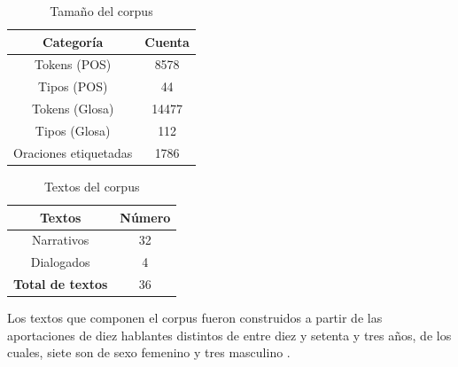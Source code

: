 \documentclass[letterpaper,12pt,oneside]{book}
\theoremstyle{definition}
\begin{document}
	\begin{table}

		\centering

		\begin{tabular}{c | c}

			\textbf{Categoría} & \textbf{Cuenta} \\ \hline

			Tokens (POS) & 8578\\

			Tipos (POS) & 44\\

			Tokens (Glosa) & 14477\\

			Tipos (Glosa) & 112\\

			Oraciones etiquetadas & 1786 \\ 

		\end{tabular}

		\caption{Tamaño del corpus}

		\label{table_corpus_length:1}

	\end{table}

	
	\begin{table}

		\centering

		\begin{tabular}{ c | c }

			\textbf{Textos} & \textbf{Número} \\ \hline

			Narrativos & 32 \\

			Dialogados & 4  \\

			\textbf{Total de textos}  & 36 \\

		\end{tabular}

		\caption{Textos del corpus}

		\label{table_corpus_text:1}

	\end{table}

	
	Los textos que componen el corpus fueron construidos a partir de las aportaciones de diez hablantes distintos de entre diez y setenta y tres años, de los cuales, siete son de sexo femenino y tres masculino \citep{lastra1992otomi}. 

	
\end{document}
